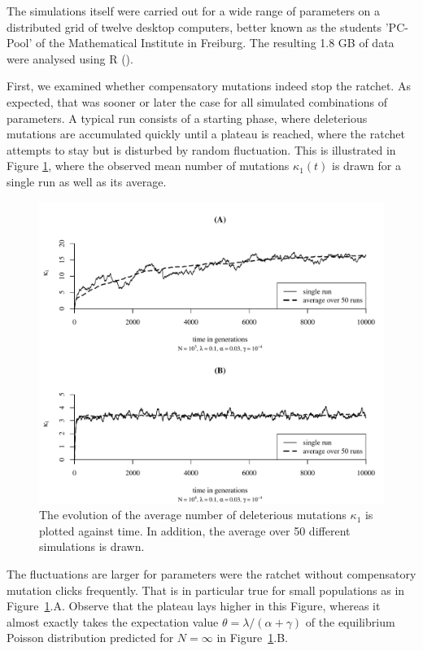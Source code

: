\noindent
The simulations itself were carried out for a wide range of parameters on a
distributed grid of twelve desktop computers, better known as the students
'PC-Pool' of the Mathematical Institute in Freiburg. The resulting 1.8 GB of
data were analysed using R (\cite{team_r:_2008}).

First, we examined whether compensatory mutations indeed stop the ratchet. As
expected, that was sooner or later the case for all simulated combinations of
parameters. A typical run consists of a starting phase, where deleterious
mutations are accumulated quickly until a plateau is reached, where the ratchet
attempts to stay but is disturbed by random fluctuation. This is illustrated in
Figure \ref{sim:f:path1}, where the observed mean number of mutations
$\kappa_1(t)$ is drawn for a single run as well as its average.

\begin{figure}[h]
  \begin{center}
	\includegraphics[width=13cm]{img/paths.pdf}
   \end{center}
  \caption{\label{sim:f:path1} The evolution of the average number of
    deleterious mutations $\kappa_1$ is plotted against time. In addition, the
    average over 50 different simulations is drawn.}
\end{figure}

\noindent
The fluctuations are larger for parameters were the ratchet without compensatory
mutation clicks frequently. That is in particular true for small populations as
in Figure~\ref{sim:f:path1}.A. Observe that the plateau lays higher in this
Figure, whereas it almost exactly takes the expectation value $\theta = \lambda / (\alpha +
\gamma)$ of the equilibrium Poisson distribution predicted for $N=\infty$ in
Figure~\ref{sim:f:path1}.B. 

